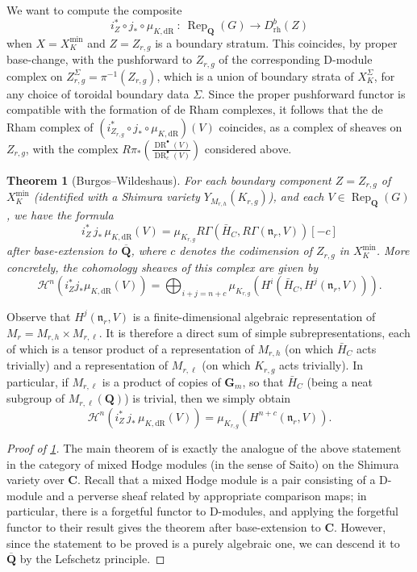 \documentclass[cjm]{ipart}
\theoremstyle{plain}
\newtheorem{theorem}{Theorem}[subsection]
\theoremstyle{remark}
\DeclareMathOperator{\DR}{DR}
\newcommand{\CC}{\mathbf{C}}
\newcommand{\QQbar}{\overline{\QQ}}
\newcommand{\QQ}{\mathbf{Q}}
\newcommand{\dR}{\mathrm{dR}}
\numberwithin{equation}{subsection}
\begin{document}
  We want to compute the composite
  \[ i_{Z}^* \circ j_* \circ \mu_{K, \dR}\ :\ \operatorname{Rep}_{\QQ}(G) \to D^b_{\mathrm{rh}}(Z) \]
  when $X = X_K^{\min}$ and $Z = Z_{r, g}$ is a boundary stratum. This coincides, by proper base-change, with the pushforward to $Z_{r, g}$ of the corresponding D-module complex on $Z_{r, g}^{\Sigma} = \pi^{-1}(Z_{r, g})$, which is a union of boundary strata of $X_K^{\Sigma}$, for any choice of toroidal boundary data $\Sigma$. Since the proper pushforward functor is compatible with the formation of de Rham complexes, it follows that the de Rham complex of $(i_{Z_{r, g}}^* \circ j_* \circ \mu_{K, \dR})(V)$ coincides, as a complex of sheaves on $Z_{r, g}$, with the complex $R\pi_*\left( \frac{\DR^\bullet(V)}{\DR^\bullet_c(V)} \right)$ considered above.

  \begin{theorem}[Burgos--Wildeshaus]\label{thm:BWh}
   For each boundary component $Z = Z_{r, g}$ of $X_K^{\min}$ (identified with a Shimura variety $Y_{M_{r, h}}(K_{r, g})$), and each $V \in \operatorname{Rep}_{\QQ}(G)$, we have the formula
   \[ i_Z^*\, j_*\,  \mu_{K, \dR}(V) = \mu_{K_{r, g}} R\Gamma(\bar{H}_C, R\Gamma(\mathfrak{n}_r, V))[-c] \]
   after base-extension to $\QQbar$, where $c$ denotes the codimension of $Z_{r, g}$ in $X_K^{\min}$. More concretely, the cohomology sheaves of this complex are given by
   \[ \mathcal{H}^n\left(i_Z^*j_* \mu_{K, \dR}(V)\right) =
    \bigoplus_{i + j = n + c}
    \mu_{K_{r, g}} \left(H^i(\bar{H}_C, H^j(\mathfrak{n}_r, V)) \right). \]
  \end{theorem}

  \begin{note}
   Observe that $H^j(\mathfrak{n}_r, V)$ is a finite-dimensional algebraic representation of $M_r = M_{r, h} \times M_{r, \ell}$. It is therefore a direct sum of simple subrepresentations, each of which is a tensor product of a representation of $M_{r, h}$ (on which $\bar{H}_C$ acts trivially) and a representation of $M_{r, \ell}$ (on which $K_{r, g}$ acts trivially). In particular, if $M_{r, \ell}$ is a product of copies of $\mathbf{G}_m$, so that $\bar{H}_C$ (being a neat subgroup of $M_{r, \ell}(\QQ)$) is trivial, then we simply obtain
   \[ \mathcal{H}^n\left(i_Z^*\, j_*\, \mu_{K, \dR}(V)\right) =
       \mu_{K_{r, g}} \left(H^{n + c}(\mathfrak{n}_r, V)\right) .\]
  \end{note}


 \begin{proof}[Proof of \cref*{thm:BWh}]
  The main theorem of \cite{burgoswildeshaus04} is exactly the analogue of the above statement in the category of mixed Hodge modules (in the sense of Saito) on the Shimura variety over $\CC$. Recall that a mixed Hodge module is a pair consisting of a D-module and a perverse sheaf related by appropriate comparison maps; in particular, there is a forgetful functor to D-modules, and applying the forgetful functor to their result gives the theorem after base-extension to $\CC$. However, since the statement to be proved is a purely algebraic one, we can descend it to $\QQbar$ by the Lefschetz principle.
 \end{proof}
\end{document}
